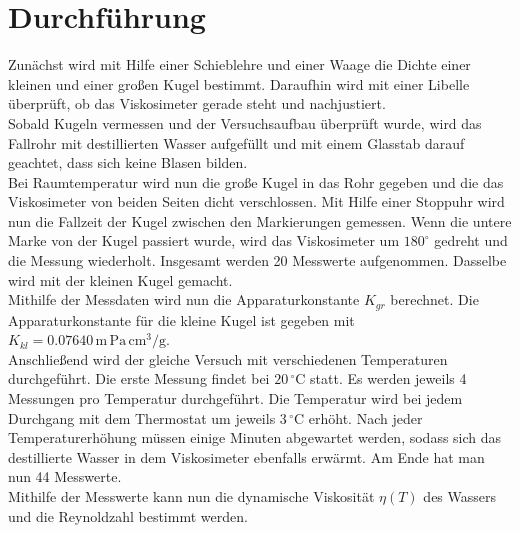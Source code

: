 \section{Durchführung}
\label{sec:Durchfuehrung}

Zunächst wird mit Hilfe einer Schieblehre und einer Waage die Dichte einer kleinen und einer großen Kugel bestimmt. Daraufhin wird mit einer
Libelle überprüft, ob das Viskosimeter gerade steht und nachjustiert.\\
Sobald Kugeln vermessen und der Versuchsaufbau überprüft wurde, wird das Fallrohr mit destillierten Wasser aufgefüllt und mit einem Glasstab darauf 
geachtet, dass sich keine Blasen bilden.\\
Bei Raumtemperatur wird nun die große Kugel in das Rohr gegeben und die das Viskosimeter von beiden Seiten dicht verschlossen. Mit Hilfe einer Stoppuhr
wird nun die Fallzeit der Kugel zwischen den Markierungen gemessen. Wenn die untere Marke von der Kugel passiert wurde, wird das Viskosimeter um $\mathrm{180^{\circ}}$
gedreht und die Messung wiederholt. Insgesamt werden 20 Messwerte aufgenommen. Dasselbe wird mit der kleinen Kugel gemacht.\\
Mithilfe der Messdaten wird nun die Apparaturkonstante $K_{gr}$ berechnet. Die Apparaturkonstante für die kleine Kugel ist gegeben mit $K_{kl} = 0.07640 \, \mathrm{m\,Pa\,cm^3/g}$.\\
Anschließend wird der gleiche Versuch mit verschiedenen Temperaturen durchgeführt. Die erste Messung findet bei $\mathrm{20\,{^\circ C}}$ statt. Es werden jeweils 4 Messungen pro
Temperatur durchgeführt. Die Temperatur wird bei jedem Durchgang mit dem Thermostat um jeweils $\mathrm{3\,{^\circ C}}$ erhöht. Nach jeder Temperaturerhöhung müssen
einige Minuten abgewartet werden, sodass sich das destillierte Wasser in dem Viskosimeter ebenfalls erwärmt. Am Ende hat man nun 44 Messwerte.\\
Mithilfe der Messwerte kann nun die dynamische Viskosität $\eta(T)$ des Wassers und die Reynoldzahl bestimmt werden.

\newpage